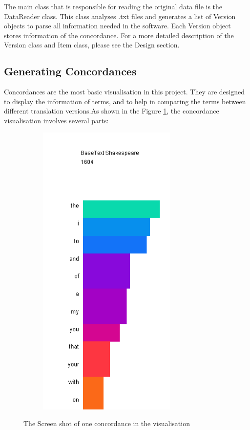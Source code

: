 The main class that is responsible for reading the original data file is the DataReader class. This class analyses .txt files and generates a list of Version objects to parse all information needed in the software. Each Version object stores information of the concordance. For a more detailed description of the Version class and Item class, please see the Design section.

\subsection{Generating Concordances}

Concordances are the most basic visualisation in this project. They are designed to display the information of terms, and to help in comparing the terms between different translation versions.As shown in the Figure \ref{fig:condorVis}, the concordance visualisation involves several parts:
\begin{figure}[h]
	\centering	
	\includegraphics[width=9cm, height=15cm]{Figs/condordanceVis}\\[1ex]
	\caption{The Screen shot of one concordance in the visualisation}
	\label{fig:condorVis}
\end{figure} 

